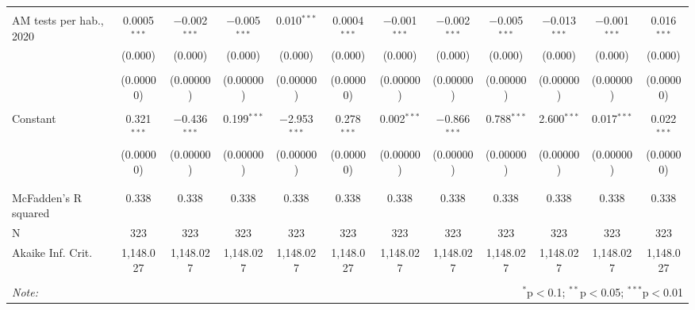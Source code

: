 \documentclass[]{interact}
\theoremstyle{plain}%
\theoremstyle{definition}
\theoremstyle{remark}
\begin{document}
\begin{table}
\begin{tabular}{@{\extracolsep{5pt}}lccccccccccc}
  & & & & & & & & & & & \\ 
 AM tests per hab., 2020 & 0.0005$^{***}$ & $-$0.002$^{***}$ & $-$0.005$^{***}$ & 0.010$^{***}$ & 0.0004$^{***}$ & $-$0.001$^{***}$ & $-$0.002$^{***}$ & $-$0.005$^{***}$ & $-$0.013$^{***}$ & $-$0.001$^{***}$ & 0.016$^{***}$ \\ 
  & (0.000) & (0.000) & (0.000) & (0.000) & (0.000) & (0.000) & (0.000) & (0.000) & (0.000) & (0.000) & (0.000) \\ 
  & & & & & & & & & & & \\ 
  & (0.00000) & (0.00000) & (0.00000) & (0.00000) & (0.00000) & (0.00000) & (0.00000) & (0.00000) & (0.00000) & (0.00000) & (0.00000) \\ 
  & & & & & & & & & & & \\ 
 Constant & 0.321$^{***}$ & $-$0.436$^{***}$ & 0.199$^{***}$ & $-$2.953$^{***}$ & 0.278$^{***}$ & 0.002$^{***}$ & $-$0.866$^{***}$ & 0.788$^{***}$ & 2.600$^{***}$ & 0.017$^{***}$ & 0.022$^{***}$ \\ 
  & (0.00000) & (0.00000) & (0.00000) & (0.00000) & (0.00000) & (0.00000) & (0.00000) & (0.00000) & (0.00000) & (0.00000) & (0.00000) \\ 
  & & & & & & & & & & & \\ 
\hline \\[-1.8ex] 
McFadden's R squared & 0.338 & 0.338 & 0.338 & 0.338 & 0.338 & 0.338 & 0.338 & 0.338 & 0.338 & 0.338 & 0.338 \\ 
N & 323 & 323 & 323 & 323 & 323 & 323 & 323 & 323 & 323 & 323 & 323 \\ 
Akaike Inf. Crit. & 1,148.027 & 1,148.027 & 1,148.027 & 1,148.027 & 1,148.027 & 1,148.027 & 1,148.027 & 1,148.027 & 1,148.027 & 1,148.027 & 1,148.027 \\ 
\hline 
\hline \\[-1.8ex] 
\textit{Note:}  & \multicolumn{11}{r}{$^{*}$p$<$0.1; $^{**}$p$<$0.05; $^{***}$p$<$0.01} \\ 
\end{tabular} 
\end{table}
\end{document}
